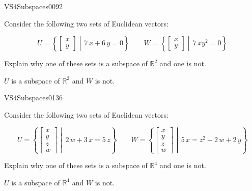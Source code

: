 \begin{exercise}{VS4}{Subspaces}{0092} 
\begin{exerciseStatement} 

Consider the following two sets of Euclidean vectors: 

 \[
          U=\left\{ \left[\begin{array}{c}
x \\
y
\end{array}\right] \middle|\,7 \, x + 6 \, y = 0\right\} \hspace{2em}  W=\left\{ \left[\begin{array}{c}
x \\
y
\end{array}\right] \middle|\,7 \, x y^{2} = 0\right\}
    \] 

 Explain why one of these sets is a subspace of \(\mathbb{R}^2\) and one is not. 

 \end{exerciseStatement}
 \begin{exerciseAnswer} 

\(U\) is a subspace of \(\mathbb{R}^2\) and \(W\) is not.

 \end{exerciseAnswer}
 \end{exercise}


\newpage




\begin{exercise}{VS4}{Subspaces}{0136} 
\begin{exerciseStatement} 

Consider the following two sets of Euclidean vectors: 

 \[
          U=\left\{ \left[\begin{array}{c}
x \\
y \\
z \\
w
\end{array}\right] \middle|\,2 \, w + 3 \, x = 5 \, z\right\} \hspace{2em}  W=\left\{ \left[\begin{array}{c}
x \\
y \\
z \\
w
\end{array}\right] \middle|\,5 \, x = z^{2} - 2 \, w + 2 \, y\right\}
    \] 

 Explain why one of these sets is a subspace of \(\mathbb{R}^4\) and one is not. 

 \end{exerciseStatement}
 \begin{exerciseAnswer} 

\(U\) is a subspace of \(\mathbb{R}^4\) and \(W\) is not.

 \end{exerciseAnswer}
 \end{exercise}



